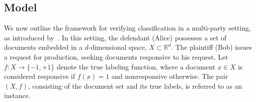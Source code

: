 \subsection{Model}

We now outline the framework for verifying classification in a multi-party setting, as introduced by~\cite{dong2022classification}.
In this setting, the defendant (Alice) possesses a set of documents embedded in a $d$-dimensional space, $X \subset \mathbb{R}^d$. The plaintiff (Bob) issues a request for production, seeking documents responsive to his request. Let $f: X \to \{-1,+1\}$ denote the true labeling function, where a document $x \in X$ is considered responsive if $f(x) = 1$ and nonresponsive otherwise.
The pair $(X, f)$, consisting of the document set and its true labels, is referred to as an instance.

